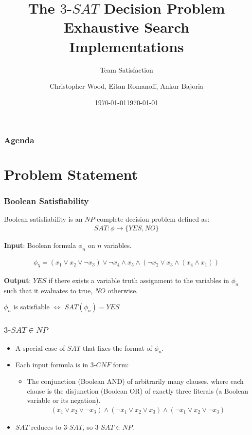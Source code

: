 \documentclass[handout]{beamer}
\title[Team Satisfaction - $3$-$SAT$]{The $3$-$SAT$ Decision Problem \\ Exhaustive Search Implementations}
\institute[RIT]{}
\date{\today}
\subtitle{Team Satisfaction}
\author{Christopher Wood, Eitan Romanoff, Ankur Bajoria}
\date{\today}
\begin{document}
\begin{frame}
	\titlepage
\end{frame}

\begin{frame}
	\frametitle{Agenda}
	\tableofcontents
\end{frame}

\section{Problem Statement}
\begin{frame}
	\frametitle{Boolean Satisfiability}

	Boolean satisfiability is an $NP$-complete decision problem defined as:
	\begin{align*}
	SAT : \phi \to \{YES, NO\}
	\end{align*}

	\medskip

	\textbf{Input}: Boolean formula $\phi_n$ on $n$ variables.
	
	\begin{align*}
		\phi_5 = (x_1 \lor x_2 \lor \lnot x_3) \lor \lnot x_4 \land x_5 \land (\lnot x_2 \lor x_3 \land (x_4 \land x_1))
	\end{align*}

	\medskip 

	\textbf{Output}: $YES$ if there exists a variable truth assignment to the
	variables in $\phi_n$ such that it evaluates to true, $NO$ otherwise.

	\medskip

	\begin{center}
		$\phi_n$ is satisfiable $\Leftrightarrow$ $SAT(\phi_n) = YES$
	\end{center}

\end{frame}


\begin{frame}
	\frametitle{$3$-$SAT \in NP$}
	\begin{itemize}
		\item A special case of $SAT$ that fixes the format of $\phi_n$.
		\item Each input formula is in $3$-$CNF$ form:
		\begin{itemize}
			\item The conjunction (Boolean AND) of arbitrarily many clauses, 
			where each clause is the disjunction (Boolean OR) of exactly three literals 
			(a Boolean variable or its negation).
			\begin{align*}
				(x_1 \lor x_2 \lor \lnot x_3) \land (\lnot x_1 \lor x_2 \lor x_3) \land (\lnot x_1 \lor x_2 \lor \lnot x_3)
			\end{align*}
		\end{itemize}
		\item $SAT$ reduces to $3$-$SAT$, so $3$-$SAT \in NP$.
	\end{itemize}
\end{frame}
\end{document}
